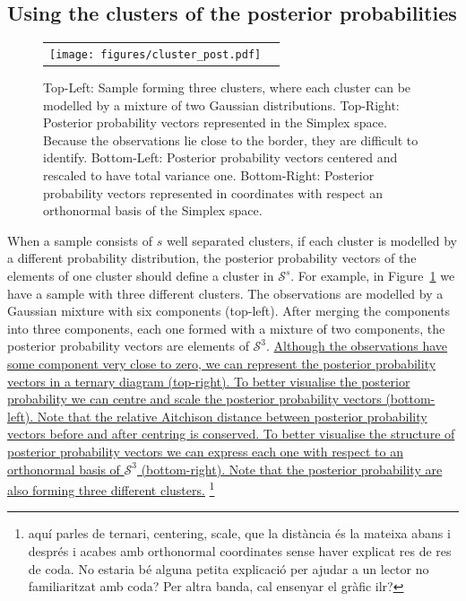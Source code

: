 \documentclass[submit]{smj}
\theoremstyle{definition}
\begin{document}
\subsection{Using the clusters of the posterior probabilities}\label{coda_clusters}

\begin{figure}[htbp]
\begin{center}
\begin{tabular}{cc}
  \texttt{[image: figures/cluster\_post.pdf]} \\
 \end{tabular}
 \caption{Top-Left: Sample forming three clusters, where each cluster can be modelled by a mixture of two Gaussian distributions. Top-Right: Posterior probability vectors represented in the Simplex space. Because the observations lie close to the border, they are difficult to identify. Bottom-Left: Posterior probability vectors centered and rescaled to have total variance one. Bottom-Right: Posterior probability vectors represented in coordinates with respect an orthonormal basis of the Simplex space.}\label{cluster_post}
\end{center}
\end{figure}

When a sample consists of $s$ well separated clusters, if each cluster is modelled by a different probability distribution, the posterior probability vectors of the elements of one cluster should define a cluster in $\mathcal{S}^s$. For example, in Figure~\ref{cluster_post} we have a sample with three different clusters. The observations are modelled by a Gaussian mixture with six components (top-left). After merging the components into three components, each one formed with a mixture of two components, the posterior probability vectors are elements of $\mathcal{S}^3$. \ul{Although the observations have some component very close to zero, we can represent the posterior probability vectors in a ternary diagram (top-right). To better visualise the posterior probability we can centre and scale the posterior probability vectors (bottom-left). Note that the relative Aitchison distance between posterior probability vectors before and after centring is conserved. To better visualise the structure of posterior probability vectors we can express each one with respect to an orthonormal basis of $\mathcal{S}^3$ (bottom-right). Note that the posterior probability are also forming three different clusters.} \footnote{aquí parles de ternari, centering, scale, que la distància és la mateixa abans i després i acabes amb orthonormal coordinates sense haver explicat res de res de coda. No estaria bé alguna petita explicació per ajudar a un lector no familiaritzat amb coda? Per altra banda, cal ensenyar el gràfic ilr?}
\end{document}
